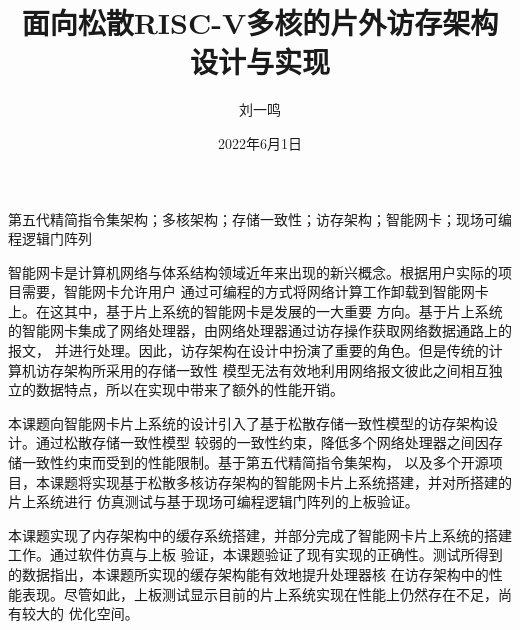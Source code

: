 \documentclass[supercite,notofont,hustthesis]{HustGraduPaper}
\title{面向松散RISC-V多核的片外访存架构设计与实现}
\author{刘一鸣}
\date{2022年6月1日}
\begin{document}
\maketitle

\statement

\clearpage


\begin{cnabstract}{第五代精简指令集架构；多核架构；存储一致性；访存架构；智能网卡；现场可编程逻辑门阵列}

智能网卡是计算机网络与体系结构领域近年来出现的新兴概念。根据用户实际的项目需要，智能网卡允许用户
通过可编程的方式将网络计算工作卸载到智能网卡上。在这其中，基于片上系统的智能网卡是发展的一大重要
方向。基于片上系统的智能网卡集成了网络处理器，由网络处理器通过访存操作获取网络数据通路上的报文，
并进行处理。因此，访存架构在设计中扮演了重要的角色。但是传统的计算机访存架构所采用的存储一致性
模型无法有效地利用网络报文彼此之间相互独立的数据特点，所以在实现中带来了额外的性能开销。

本课题向智能网卡片上系统的设计引入了基于松散存储一致性模型的访存架构设计。通过松散存储一致性模型
较弱的一致性约束，降低多个网络处理器之间因存储一致性约束而受到的性能限制。基于第五代精简指令集架构，
以及多个开源项目，本课题将实现基于松散多核访存架构的智能网卡片上系统搭建，并对所搭建的片上系统进行
仿真测试与基于现场可编程逻辑门阵列的上板验证。

本课题实现了内存架构中的缓存系统搭建，并部分完成了智能网卡片上系统的搭建工作。通过软件仿真与上板
验证，本课题验证了现有实现的正确性。测试所得到的数据指出，本课题所实现的缓存架构能有效地提升处理器核
在访存架构中的性能表现。尽管如此，上板测试显示目前的片上系统实现在性能上仍然存在不足，尚有较大的
优化空间。

\end{cnabstract}
\end{document}

